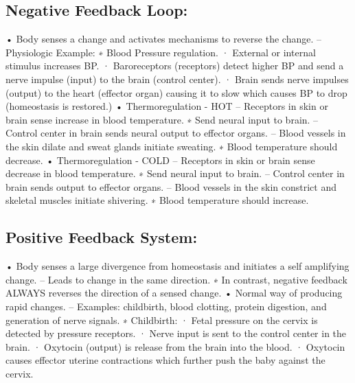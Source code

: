 \documentclass[12pt]{article}
\begin{document}
\subsection{Negative Feedback Loop:}
\newline• Body senses a change and activates mechanisms to reverse the change.
\newline– Physiologic Example:
\newline∗ Blood Pressure regulation.
\newline· External or internal stimulus increases BP.
\newline· Baroreceptors (receptors) detect higher BP and send a nerve
impulse (input) to the brain (control center).
\newline· Brain sends nerve impulses (output) to the heart (effector organ) causing it to slow which causes BP to drop (homeostasis
is restored.)
\newline• Thermoregulation - HOT
\newline– Receptors in skin or brain sense increase in blood temperature.
\newline∗ Send neural input to brain.
\newline– Control center in brain sends neural output to effector organs.
\newline– Blood vessels in the skin dilate and sweat glands initiate sweating.
\newline∗ Blood temperature should decrease.
\newline• Thermoregulation - COLD
\newline– Receptors in skin or brain sense decrease in blood temperature.
\newline∗ Send neural input to brain.
\newline– Control center in brain sends output to effector organs.
\newline– Blood vessels in the skin constrict and skeletal muscles initiate shivering.
\newline∗ Blood temperature should increase.
\subsection{Positive Feedback System:}
\newline• Body senses a large divergence from homeostasis and initiates a self amplifying change.
\newline– Leads to change in the same direction.
\newline∗ In contrast, negative feedback ALWAYS reverses the direction of
a sensed change.
\newline• Normal way of producing rapid changes.
\newline– Examples: childbirth, blood clotting, protein digestion, and generation of nerve signals.
\newline∗ Childbirth:
\newline· Fetal pressure on the cervix is detected by pressure receptors.
\newline· Nerve input is sent to the control center in the brain.
\newline· Oxytocin (output) is release from the brain into the blood.
\newline· Oxytocin causes effector uterine contractions which further
push the baby against the cervix.
\end{document}

